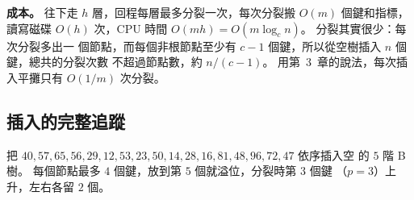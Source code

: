 \textbf{成本。} 往下走 $h$ 層，回程每層最多分裂一次，每次分裂搬 $O(m)$ 個鍵和指標，
讀寫磁碟 $O(h)$ 次，CPU 時間 $O(mh) = O(m \log_c n)$。 分裂其實很少：每次分裂多出一
個節點，而每個非根節點至少有 $c - 1$ 個鍵，所以從空樹插入 $n$ 個鍵，總共的分裂次數
不超過節點數，約 $n / (c - 1)$。 用第~3~章的說法，每次插入平攤只有 $O(1/m)$ 次分裂。

\subsection{插入的完整追蹤}
\label{sec:mw-b-trace}

把 $40, 57, 65, 56, 29, 12, 53, 23, 50, 14, 28, 16, 81, 48, 96, 72, 47$ 依序插入空
的 $5$ 階 B 樹。 每個節點最多 $4$ 個鍵，放到第 $5$ 個就溢位，分裂時第 $3$ 個鍵
（$p = 3$）上升，左右各留 $2$ 個。

